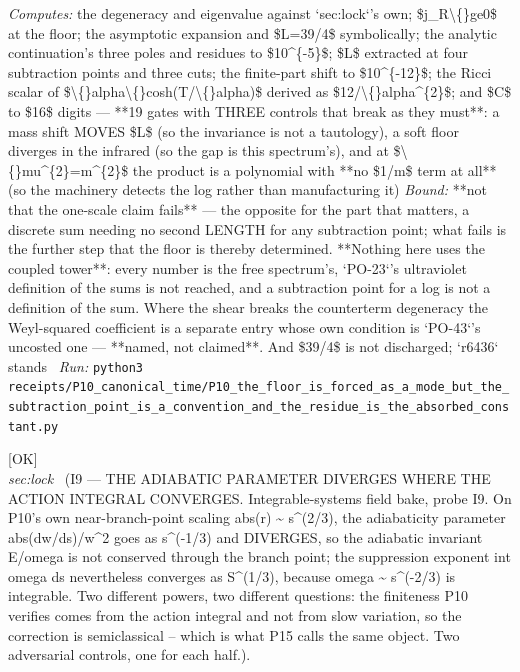 \begin{description}
\emph{Computes:} the degeneracy and eigenvalue against `sec:lock`'s own; \$j\_R\textbackslash\{\}ge0\$ at the floor; the asymptotic expansion and \$L=39/4\$ symbolically; the analytic continuation's three poles and residues to \$10\textasciicircum{}\{-5\}\$; \$L\$ extracted at four subtraction points and three cuts; the finite-part shift to \$10\textasciicircum{}\{-12\}\$; the Ricci scalar of \$\textbackslash\{\}alpha\textbackslash\{\}cosh(T/\textbackslash\{\}alpha)\$ derived as \$12/\textbackslash\{\}alpha\textasciicircum{}\{2\}\$; and \$C\$ to \$16\$ digits --- **19 gates with THREE controls that break as they must**: a mass shift MOVES \$L\$ (so the invariance is not a tautology), a soft floor diverges in the infrared (so the gap is this spectrum's), and at \$\textbackslash\{\}mu\textasciicircum{}\{2\}=m\textasciicircum{}\{2\}\$ the product is a polynomial with **no \$1/m\$ term at all** (so the machinery detects the log rather than manufacturing it)
 \emph{Bound:}  **not that the one-scale claim fails** --- the opposite for the part that matters, a discrete sum needing no second LENGTH for any subtraction point; what fails is the further step that the floor is thereby determined.  **Nothing here uses the coupled tower**: every number is the free spectrum's, `PO-23`'s ultraviolet definition of the sums is not reached, and a subtraction point for a log is not a definition of the sum. Where the shear breaks the counterterm degeneracy the Weyl-squared coefficient is a separate entry whose own condition is `PO-43`'s uncosted one --- **named, not claimed**. And \$39/4\$ is not discharged; `r6436` stands
\ \emph{Run:} \texttt{python3 receipts/P10\_canonical\_time/P10\_the\_floor\_is\_forced\_as\_a\_mode\_but\_the\_subtraction\_point\_is\_a\_convention\_and\_the\_residue\_is\_the\_absorbed\_constant.py}
\item[\rcptlabel{I9_the_adiabatic_parameter_diverges_where_the_action_integral_converges}{P10R19}\textbf{P10R19}\quad\texttt{I9\_the\_adiabatic\_parameter\_diverges\_where\_the\_action\_integral\_converges}]\hfill\textsf{[OK]}\\
\textit{sec:lock} \ (I9 --- THE ADIABATIC PARAMETER DIVERGES WHERE THE ACTION INTEGRAL CONVERGES. Integrable-systems field bake, probe I9. On P10's own near-branch-point scaling abs(r) \textasciitilde{} s\textasciicircum{}(2/3), the adiabaticity parameter abs(dw/ds)/w\textasciicircum{}2 goes as s\textasciicircum{}(-1/3) and DIVERGES, so the adiabatic invariant E/omega is not conserved through the branch point; the suppression exponent int omega ds nevertheless converges as S\textasciicircum{}(1/3), because omega \textasciitilde{} s\textasciicircum{}(-2/3) is integrable. Two different powers, two different questions: the finiteness P10 verifies comes from the action integral and not from slow variation, so the correction is semiclassical -- which is what P15 calls the same object. Two adversarial controls, one for each half.). 

\end{description}
